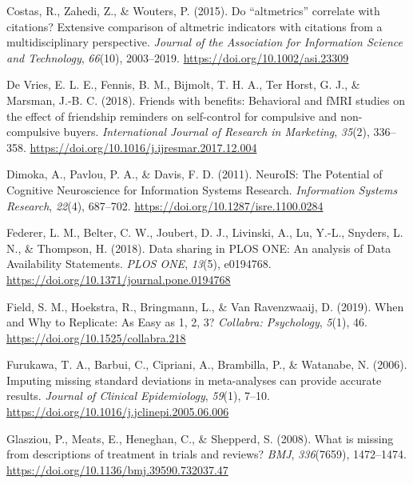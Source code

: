 \documentclass[
  man,floatsintext]{apa6}
\newlength{\cslhangindent}
\newlength{\cslentryspacingunit} %
\newenvironment{CSLReferences}[2] %
 {%
  \setlength{\parindent}{0pt}
  \ifodd #1
  \let\oldpar\par
  \def\par{\hangindent=\cslhangindent\oldpar}
  \fi
  \setlength{\parskip}{#2\cslentryspacingunit}
 }%
 {}
\begin{document}
\begin{CSLReferences}{1}{0}
\leavevmode{}%
Costas, R., Zahedi, Z., \& Wouters, P. (2015). Do {``altmetrics''} correlate with citations? {Extensive} comparison of altmetric indicators with citations from a multidisciplinary perspective. \emph{Journal of the Association for Information Science and Technology}, \emph{66}(10), 2003--2019. \url{https://doi.org/10.1002/asi.23309}

\leavevmode{}%
De Vries, E. L. E., Fennis, B. M., Bijmolt, T. H. A., Ter Horst, G. J., \& Marsman, J.-B. C. (2018). Friends with benefits: {Behavioral} and {fMRI} studies on the effect of friendship reminders on self-control for compulsive and non-compulsive buyers. \emph{International Journal of Research in Marketing}, \emph{35}(2), 336--358. \url{https://doi.org/10.1016/j.ijresmar.2017.12.004}

\leavevmode{}%
Dimoka, A., Pavlou, P. A., \& Davis, F. D. (2011). {NeuroIS}: {The Potential} of {Cognitive Neuroscience} for {Information Systems Research}. \emph{Information Systems Research}, \emph{22}(4), 687--702. \url{https://doi.org/10.1287/isre.1100.0284}

\leavevmode{}%
Federer, L. M., Belter, C. W., Joubert, D. J., Livinski, A., Lu, Y.-L., Snyders, L. N., \& Thompson, H. (2018). Data sharing in {PLOS ONE}: {An} analysis of {Data Availability Statements}. \emph{PLOS ONE}, \emph{13}(5), e0194768. \url{https://doi.org/10.1371/journal.pone.0194768}

\leavevmode{}%
Field, S. M., Hoekstra, R., Bringmann, L., \& Van Ravenzwaaij, D. (2019). When and {Why} to {Replicate}: {As Easy} as 1, 2, 3? \emph{Collabra: Psychology}, \emph{5}(1), 46. \url{https://doi.org/10.1525/collabra.218}

\leavevmode{}%
Furukawa, T. A., Barbui, C., Cipriani, A., Brambilla, P., \& Watanabe, N. (2006). Imputing missing standard deviations in meta-analyses can provide accurate results. \emph{Journal of Clinical Epidemiology}, \emph{59}(1), 7--10. \url{https://doi.org/10.1016/j.jclinepi.2005.06.006}

\leavevmode{}%
Glasziou, P., Meats, E., Heneghan, C., \& Shepperd, S. (2008). What is missing from descriptions of treatment in trials and reviews? \emph{BMJ}, \emph{336}(7659), 1472--1474. \url{https://doi.org/10.1136/bmj.39590.732037.47}


\end{CSLReferences}
\end{document}
